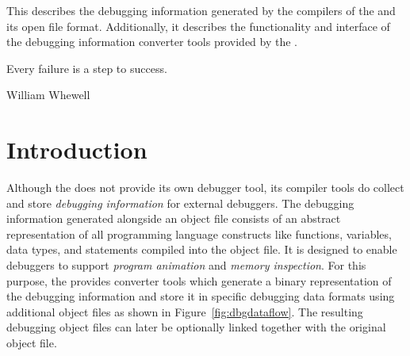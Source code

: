 




\renewcommand{\seedebugging}{}

{This \documentation{} describes the debugging information generated by the compilers of the \ecs{} and its open file format.
Additionally, it describes the functionality and interface of the debugging information converter tools provided by the \ecs{}.}

\epigraph{Every failure is a step to success.}{William Whewell}

\section{Introduction}

Although the \ecs{} does not provide its own debugger tool, its compiler tools do collect and store \emph{debugging information} for external debuggers.
The debugging information generated alongside an object file consists of an abstract representation of all programming language constructs like functions, variables, data types, and statements compiled into the object file.
It is designed to enable debuggers to support \emph{program animation} and \emph{memory inspection}.
For this purpose, the \ecs{} provides converter tools which generate a binary representation of the debugging information and store it in specific debugging data formats using additional object files as shown in Figure~\ref{fig:dbgdataflow}.
The resulting debugging object files can later be optionally linked together with the original object file.
\seeobject


